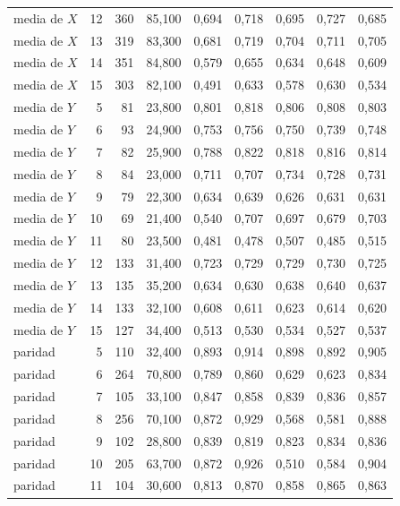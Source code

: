 \begin{table}[htbp]
{\begin{tabular}{@{}lrrrrrrrr@{}}
        media de $X$ & 12 & 360 & 85,100 & 0,694 & 0,718 & 0,695 & 0,727 & 0,685 \\
        media de $X$ & 13 & 319 & 83,300 & 0,681 & 0,719 & 0,704 & 0,711 & 0,705 \\
        media de $X$ & 14 & 351 & 84,800 & 0,579 & 0,655 & 0,634 & 0,648 & 0,609 \\
        media de $X$ & 15 & 303 & 82,100 & 0,491 & 0,633 & 0,578 & 0,630 & 0,534 \\
        media de $Y$ & 5 & 81 & 23,800 & 0,801 & 0,818 & 0,806 & 0,808 & 0,803 \\
        media de $Y$ & 6 & 93 & 24,900 & 0,753 & 0,756 & 0,750 & 0,739 & 0,748 \\
        media de $Y$ & 7 & 82 & 25,900 & 0,788 & 0,822 & 0,818 & 0,816 & 0,814 \\
        media de $Y$ & 8 & 84 & 23,000 & 0,711 & 0,707 & 0,734 & 0,728 & 0,731 \\
        media de $Y$ & 9 & 79 & 22,300 & 0,634 & 0,639 & 0,626 & 0,631 & 0,631 \\
        media de $Y$ & 10 & 69 & 21,400 & 0,540 & 0,707 & 0,697 & 0,679 & 0,703 \\
        media de $Y$ & 11 & 80 & 23,500 & 0,481 & 0,478 & 0,507 & 0,485 & 0,515 \\
        media de $Y$ & 12 & 133 & 31,400 & 0,723 & 0,729 & 0,729 & 0,730 & 0,725 \\
        media de $Y$ & 13 & 135 & 35,200 & 0,634 & 0,630 & 0,638 & 0,640 & 0,637 \\
        media de $Y$ & 14 & 133 & 32,100 & 0,608 & 0,611 & 0,623 & 0,614 & 0,620 \\
        media de $Y$ & 15 & 127 & 34,400 & 0,513 & 0,530 & 0,534 & 0,527 & 0,537 \\
        paridad & 5 & 110 & 32,400 & 0,893 & 0,914 & 0,898 & 0,892 & 0,905 \\
        paridad & 6 & 264 & 70,800 & 0,789 & 0,860 & 0,629 & 0,623 & 0,834 \\
        paridad & 7 & 105 & 33,100 & 0,847 & 0,858 & 0,839 & 0,836 & 0,857 \\
        paridad & 8 & 256 & 70,100 & 0,872 & 0,929 & 0,568 & 0,581 & 0,888 \\
        paridad & 9 & 102 & 28,800 & 0,839 & 0,819 & 0,823 & 0,834 & 0,836 \\
        paridad & 10 & 205 & 63,700 & 0,872 & 0,926 & 0,510 & 0,584 & 0,904 \\
        paridad & 11 & 104 & 30,600 & 0,813 & 0,870 & 0,858 & 0,865 & 0,863 \\

\end{tabular}}
\end{table}
